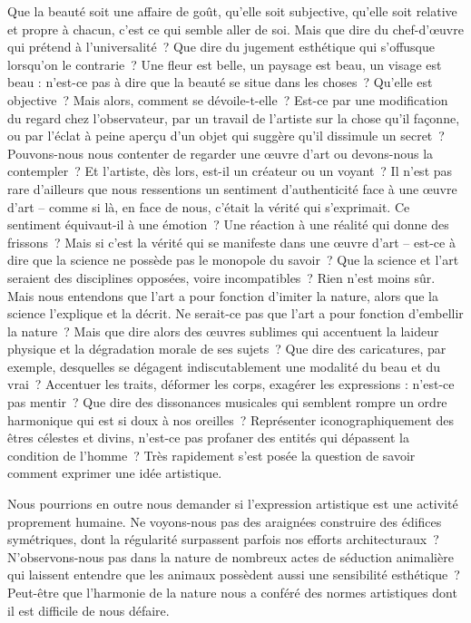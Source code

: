 \documentclass[
  10pt,
  french,
  a5paper,
  openany]{book}
\begin{document}
Que la beauté soit une affaire de goût, qu'elle soit subjective, qu'elle soit relative et propre à chacun, c'est ce qui semble aller de soi. Mais que dire du chef-d'œuvre qui prétend à l'universalité~? Que dire du jugement esthétique qui s'offusque lorsqu'on le contrarie~? Une fleur est belle, un paysage est beau, un visage est beau : n'est-ce pas à dire que la beauté se situe dans les choses~? Qu'elle est objective~? Mais alors, comment se dévoile-t-elle~? Est-ce par une modification du regard chez l'observateur, par un travail de l'artiste sur la chose qu'il façonne, ou par l'éclat à peine aperçu d'un objet qui suggère qu'il dissimule un secret~? Pouvons-nous nous contenter de regarder une œuvre d'art ou devons-nous la contempler~? Et l'artiste, dès lors, est-il un créateur ou un voyant~? Il n'est pas rare d'ailleurs que nous ressentions un sentiment d'authenticité face à une œuvre d'art -- comme si là, en face de nous, c'était la vérité qui s'exprimait. Ce sentiment équivaut-il à une émotion~? Une réaction à une réalité qui donne des frissons~? Mais si c'est la vérité qui se manifeste dans une œuvre d'art -- est-ce à dire que la science ne possède pas le monopole du savoir~? Que la science et l'art seraient des disciplines opposées, voire incompatibles~? Rien n'est moins sûr. Mais nous entendons que l'art a pour fonction d'imiter la nature, alors que la science l'explique et la décrit. Ne serait-ce pas que l'art a pour fonction d'embellir la nature~? Mais que dire alors des œuvres sublimes qui accentuent la laideur physique et la dégradation morale de ses sujets~? Que dire des caricatures, par exemple, desquelles se dégagent indiscutablement une modalité du beau et du vrai~? Accentuer les traits, déformer les corps, exagérer les expressions : n'est-ce pas mentir~? Que dire des dissonances musicales qui semblent rompre un ordre harmonique qui est si doux à nos oreilles~? Représenter iconographiquement des êtres célestes et divins, n'est-ce pas profaner des entités qui dépassent la condition de l'homme~? Très rapidement s'est posée la question de savoir comment exprimer une idée artistique.

Nous pourrions en outre nous demander si l'expression artistique est une activité proprement humaine. Ne voyons-nous pas des araignées construire des édifices symétriques, dont la régularité surpassent parfois nos efforts architecturaux~? N'observons-nous pas dans la nature de nombreux actes de séduction animalière qui laissent entendre que les animaux possèdent aussi une sensibilité esthétique~? Peut-être que l'harmonie de la nature nous a conféré des normes artistiques dont il est difficile de nous défaire.
\end{document}
